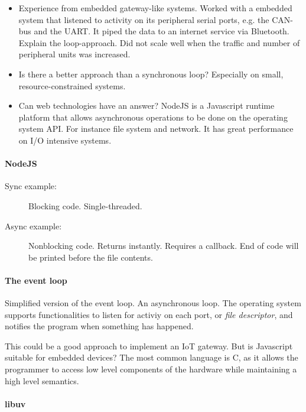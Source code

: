 \documentclass{memoir}
\begin{document}
\begin{itemize}
    \item Experience from embedded gateway-like systems. Worked with a embedded
        system that listened to activity on its peripheral serial ports, e.g.
        the CAN-bus and the UART. It piped the data to an internet service via
        Bluetooth. Explain the loop-approach. Did not scale well when the
        traffic and number of peripheral units was increased.
    \item Is there a better approach than a synchronous loop? Especially on
        small, resource-constrained systems.
    \item Can web technologies have an answer? NodeJS is a Javascript runtime
        platform that allows asynchronous operations to be done on the
        operating system API. For instance file system and network. It has
        great performance on I/O intensive systems.
\end{itemize}

\paragraph{NodeJS}

\begin{description}
    \item[Sync example:] Blocking code. Single-threaded.
    \item[Async example:] Nonblocking code. Returns instantly. Requires a
        callback. End of code will be printed before the file contents.
\end{description}

\paragraph{The event loop}

Simplified version of the event loop. An asynchronous loop. The operating
system supports functionalities to listen for activiy on each port, or
\textit{file descriptor}, and notifies the program when something has happened.

This could be a good approach to implement an IoT gateway. But is Javascript
suitable for embedded devices? The most common language is C, as it allows the
programmer to access low level components of the hardware while maintaining a
high level semantics.

\paragraph{libuv}
\end{document}
